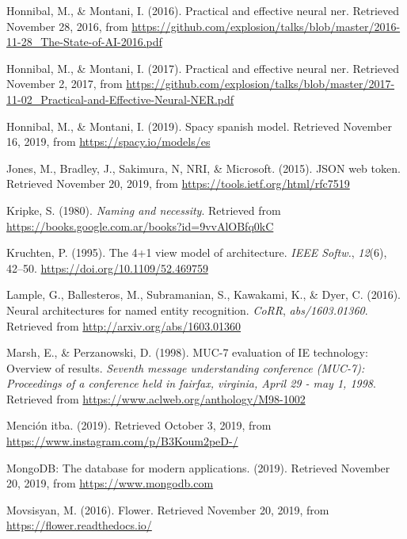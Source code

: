 \documentclass[12pt,a4paper,]{scrartcl}
\begin{document}
\leavevmode\hypertarget{ref-montani_AI}{}%
Honnibal, M., \& Montani, I. (2016). Practical and effective neural ner. Retrieved November 28, 2016, from \url{https://github.com/explosion/talks/blob/master/2016-11-28_The-State-of-AI-2016.pdf}

\leavevmode\hypertarget{ref-honnibal_NER}{}%
Honnibal, M., \& Montani, I. (2017). Practical and effective neural ner. Retrieved November 2, 2017, from \url{https://github.com/explosion/talks/blob/master/2017-11-02_Practical-and-Effective-Neural-NER.pdf}

\leavevmode\hypertarget{ref-spacy-spanish-model}{}%
Honnibal, M., \& Montani, I. (2019). Spacy spanish model. Retrieved November 16, 2019, from \url{https://spacy.io/models/es}

\leavevmode\hypertarget{ref-JWT}{}%
Jones, M., Bradley, J., Sakimura, N, NRI, \& Microsoft. (2015). JSON web token. Retrieved November 20, 2019, from \url{https://tools.ietf.org/html/rfc7519}

\leavevmode\hypertarget{ref-kripke1980naming}{}%
Kripke, S. (1980). \emph{Naming and necessity}. Retrieved from \url{https://books.google.com.ar/books?id=9vvAlOBfq0kC}

\leavevmode\hypertarget{ref-Kruchten:1995:VMA:624610.625529}{}%
Kruchten, P. (1995). The 4+1 view model of architecture. \emph{IEEE Softw.}, \emph{12}(6), 42--50. \url{https://doi.org/10.1109/52.469759}

\leavevmode\hypertarget{ref-DBLP:journalsux2fcorrux2fLampleBSKD16}{}%
Lample, G., Ballesteros, M., Subramanian, S., Kawakami, K., \& Dyer, C. (2016). Neural architectures for named entity recognition. \emph{CoRR}, \emph{abs/1603.01360}. Retrieved from \url{http://arxiv.org/abs/1603.01360}

\leavevmode\hypertarget{ref-marsh-perzanowski-1998-muc}{}%
Marsh, E., \& Perzanowski, D. (1998). MUC-7 evaluation of IE technology: Overview of results. \emph{Seventh message understanding conference (MUC-7): Proceedings of a conference held in fairfax, virginia, April 29 - may 1, 1998}. Retrieved from \url{https://www.aclweb.org/anthology/M98-1002}

\leavevmode\hypertarget{ref-mediaparty2019_win}{}%
Mención itba. (2019). Retrieved October 3, 2019, from \url{https://www.instagram.com/p/B3Koum2peD-/}

\leavevmode\hypertarget{ref-mongodb}{}%
MongoDB: The database for modern applications. (2019). Retrieved November 20, 2019, from \url{https://www.mongodb.com}

\leavevmode\hypertarget{ref-flower}{}%
Movsisyan, M. (2016). Flower. Retrieved November 20, 2019, from \url{https://flower.readthedocs.io/}
\end{document}
